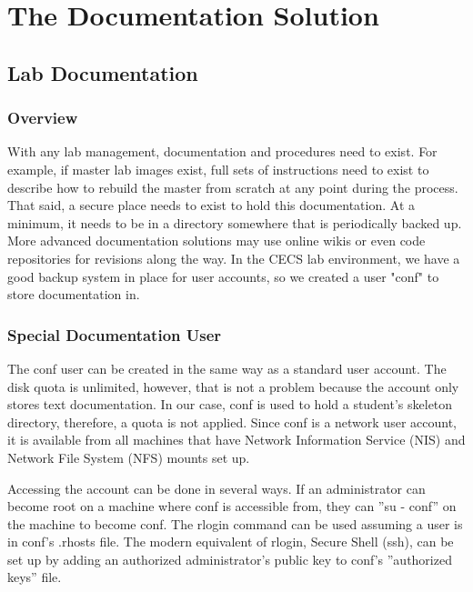 \chapter{The Documentation Solution} \label{ch:documentation_solution}
\section{Lab Documentation}\label{sec:documentation_solution}
\subsection{Overview}
With any lab management, documentation and procedures need to exist.  For example, if master lab images exist, full sets of instructions need to exist to describe how to rebuild the master from scratch at any point during the process.  That said, a secure place needs to exist to hold this documentation.  At a minimum, it needs to be in a directory somewhere that is periodically backed up.  More advanced documentation solutions may use online wikis or even code repositories for revisions along the way.  In the CECS lab environment, we have a good backup system in place for user accounts, so we created a user "conf" to store documentation in.  

\subsection{Special Documentation User}
The conf user can be created in the same way as a standard user account.  The disk quota is unlimited, however, that is not a problem because the account only stores text documentation.  In our case, conf is used to hold a student’s skeleton directory, therefore, a quota is not applied.  Since conf is a network user account, it is available from all machines that have Network Information Service (NIS) and Network File System (NFS) mounts set up.  

Accessing the account can be done in several ways.  If an administrator can become root on a machine where conf is accessible from, they can ”su - conf” on the machine to become conf.  The rlogin command can be used assuming a user is in conf’s .rhosts ﬁle.  The modern equivalent of rlogin, Secure Shell (ssh), can be set up by adding an authorized administrator’s public key to conf’s ”authorized keys” file.  

